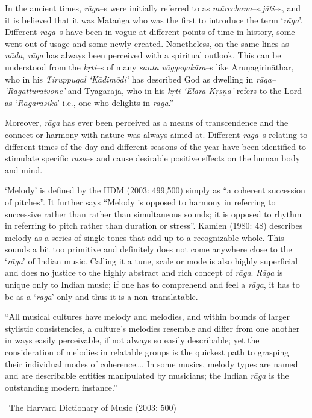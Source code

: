 In the ancient times, \textit{rāga}–s were initially referred to as \textit{mūrcchana}–s,\break \textit{jāti}–s, and it is believed that it was Mataṅga who was the first to introduce the term ‘\textit{rāga}’. Different \textit{rāga}–s have been in vogue at different points of time in history, some went out of usage and some newly created. Nonetheless, on the same lines as \textit{nāda}, \textit{rāga} has always been perceived with a spiritual outlook. This can be understood from the \textit{kṛti}–s of many \textit{santa vāggeyakāra}–s like Aruṇagirināthar, who in his \textit{Tiruppugaḻ ‘Kādimōdi’} has described God as dwelling in \textit{rāga– ‘Rāgatturaivone’} and Tyāgarāja, who in his \textit{kṛti ‘Elarā Kṛṣṇa’} refers to the Lord as ‘\textit{Rāgarasika}’ i.e., one who delights in \textit{rāga}.”

Moreover, \textit{rāga} has ever been perceived as a means of transcendence and the connect or harmony with nature was always aimed at. Different \textit{rāga}–s relating to different times of the day and different seasons of the year have been identified to stimulate specific \textit{rasa}–s and cause desirable positive effects on the human body and mind.

‘Melody’ is defined by the HDM (2003: 499,500) simply as “a coherent succession of pitches”. It further says “Melody is opposed to harmony in referring to successive rather than rather than simultaneous sounds; it is opposed to rhythm in referring to pitch rather than duration or stress”. Kamien (1980: 48) describes melody as a series of single tones that add up to a recognizable whole. This sounds a bit too primitive and definitely does not come anywhere close to the ‘\textit{rāga}’ of Indian music. Calling it a tune, scale or mode is also highly superficial and does no justice to the highly abstract and rich concept of \textit{rāga}. \textit{Rāga} is unique only to Indian music; if one has to comprehend and feel a \textit{rāga}, it has to be as a ‘\textit{rāga}’ only and thus it is a non–translatable.

\begin{myquote}
“All musical cultures have melody and melodies, and within bounds of larger stylistic consistencies, a culture’s melodies resemble and differ from one another in ways easily perceivable, if not always so easily describable; yet the consideration of melodies in relatable groups is the quickest path to grasping their individual modes of coherence…. In some musics, melody types are named and are describable entities manipulated by musicians; the Indian \textit{rāga} is the outstanding modern instance.” 

~\hfill The Harvard Dictionary of Music (2003: 500)
\end{myquote}

